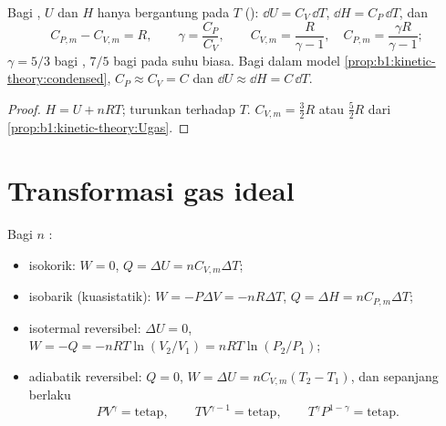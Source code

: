 \begin{proposition}\label{prop:b1:first-law:gas}
Bagi , $U$ dan $H$ hanya bergantung pada $T$ ():
$\dd U = C_V\,\dd T$, $\dd H = C_P\,\dd T$, dan
\[
C_{P,m} - C_{V,m} = R, \qquad \gamma = \frac{C_P}{C_V}, \qquad
C_{V,m} = \frac{R}{\gamma - 1}, \quad C_{P,m} = \frac{\gamma R}{\gamma - 1} ;
\]
$\gamma = 5/3$ bagi , $7/5$ bagi  pada suhu
biasa. Bagi  dalam model
\cref{prop:b1:kinetic-theory:condensed}, $C_P \approx C_V = C$ dan
$\dd U \approx \dd H = C\,\dd T$.
\end{proposition}

\begin{proof}
$H = U + nRT$; turunkan terhadap $T$. $C_{V,m} = \tfrac32 R$ atau
$\tfrac52 R$ dari \cref{prop:b1:kinetic-theory:Ugas}.
\end{proof}

\section{Transformasi gas ideal}

\begin{proposition}\label{prop:b1:first-law:transformations}
Bagi $n$  :
\begin{itemize}
  \item isokorik: $W = 0$, $Q = \Delta U = nC_{V,m}\Delta T$;
  \item isobarik (kuasistatik): $W = -P\Delta V = -nR\Delta T$, $Q = \Delta H =
        nC_{P,m}\Delta T$;
  \item isotermal reversibel: $\Delta U = 0$, $W = -Q = -nRT\ln(V_2/V_1) =
        nRT\ln(P_2/P_1)$;
  \item adiabatik reversibel: $Q = 0$, $W = \Delta U = nC_{V,m}(T_2 - T_1)$,
        dan sepanjang  berlaku \emph{}
        \[
        PV^\gamma = \text{tetap}, \qquad TV^{\gamma - 1} = \text{tetap}, \qquad
        T^\gamma P^{1 - \gamma} = \text{tetap} .
        \]
\end{itemize}
\end{proposition}

